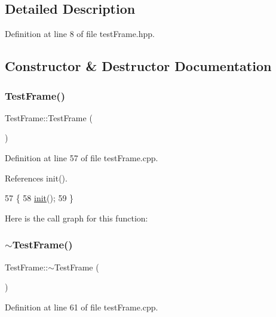 \subsection{Detailed Description}


Definition at line 8 of file test\+Frame.\+hpp.



\subsection{Constructor \& Destructor Documentation}
\mbox{\label{class_test_frame_adaa27a5475a2455990002fce216ccb39}} 
\subsubsection{\texorpdfstring{Test\+Frame()}{TestFrame()}}
{\footnotesize\ttfamily Test\+Frame\+::\+Test\+Frame (\begin{DoxyParamCaption}{ }\end{DoxyParamCaption})}



Definition at line 57 of file test\+Frame.\+cpp.



References init().


\begin{DoxyCode}
57                      \{
58   \hyperlink{class_test_frame_a54de7710b7685cff78b034f0f631c31d}{init}();
59 \}
\end{DoxyCode}
Here is the call graph for this function\+:
\mbox{\label{class_test_frame_a1b949a105850e3cc7886093d18c11758}} 
\subsubsection{\texorpdfstring{$\sim$\+Test\+Frame()}{~TestFrame()}}
{\footnotesize\ttfamily Test\+Frame\+::$\sim$\+Test\+Frame (\begin{DoxyParamCaption}{ }\end{DoxyParamCaption})}



Definition at line 61 of file test\+Frame.\+cpp.


